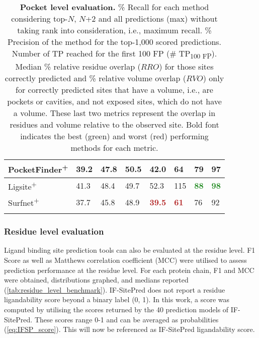 \begin{landscape}
\begin{longtable}[c]{|M{27mm}|M{27mm}|M{29mm}|M{24mm}|M{27mm}|M{22mm}|M{20mm}|M{20mm}|}
PocketFinder\textsuperscript{+}  & 39.2           & 47.8             & 50.5         & 42.0             & 64          & 79     & 97     \\ \hline
Ligsite\textsuperscript{+}       & 41.3           & 48.4             & 49.7         & 52.3           & 115         & \textbf{\textcolor{forestgreen}{88}}             & \textbf{\textcolor{forestgreen}{98}}             \\ \hline
Surfnet\textsuperscript{+}       & 37.7           & 45.8             & 48.9         & \textbf{\textcolor{firebrick}{39.5}}           & \textbf{\textcolor{firebrick}{61}}                  & 76     & 92     \\ \hline
\caption[Pocket level evaluation]{\textbf{Pocket level evaluation.} \% Recall for each method considering top-$N$, $N$+2 and all predictions (max) without taking rank into consideration, i.e., maximum recall. \% Precision of the method for the top-1,000 scored predictions. Number of TP reached for the first 100 FP (\# TP\textsubscript{100 FP}). Median \% relative residue overlap ($RRO$) for those sites correctly predicted and \% relative volume overlap ($RVO$) only for correctly predicted sites that have a volume, i.e., are pockets or cavities, and not exposed sites, which do not have a volume. These last two metrics represent the overlap in residues and volume relative to the observed site. Bold font indicates the best (green) and worst (red) performing methods for each metric.}
\label{tab:pocket_level_benchmark}\\
\end{longtable}
\end{landscape}

\subsubsection{Residue level evaluation}

Ligand binding site prediction tools can also be evaluated at the residue level. F1 Score as well as Matthews correlation coefficient (MCC) were utilised to assess prediction performance at the residue level. For each protein chain, F1 and MCC were obtained, distributions graphed, and medians reported (\autoref{tab:residue_level_benchmark}). IF-SitePred does not report a residue ligandability score beyond a binary label (0, 1). In this work, a score was computed by utilising the scores returned by the 40 prediction models of IF-SitePred. These scores range 0-1 and can be averaged as probabilities (\autoref{eq:IFSP_score}). This will now be referenced as IF-SitePred ligandability score.

